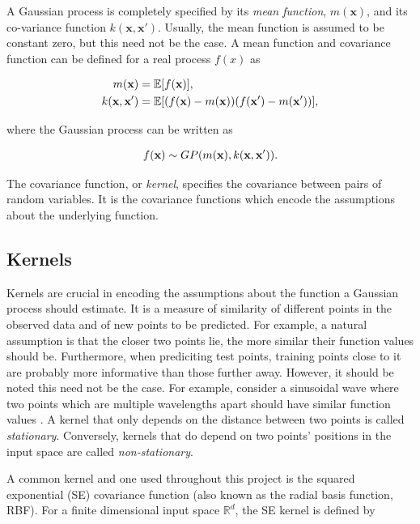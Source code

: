 \documentclass[12pt,a4paper]{report}
\theoremstyle{definition}
\begin{document}
A Gaussian process is completely specified by its \emph{mean function}, $m(\textbf{x})$, and its co-variance function $k(\textbf{x}, \textbf{x}')$.
Usually, the mean function is assumed to be constant zero, but this need not be the case.
A mean function and covariance function can be defined for a real process $f(x)$ as 

\begin{equation}
	\begin{aligned}
		\centering
		m(\textbf{x}) &= \mathbb{E}[f(\textbf{x})],\\
		k(\textbf{x}, \textbf{x}') &= \mathbb{E}[(f(\textbf{x}) - m(\textbf{x}))(f(\textbf{x}') - m(\textbf{x}'))],
	\end{aligned}
\end{equation}

where the Gaussian process can be written as 

\begin{equation}
	\centering
	f(\textbf{x}) \sim GP(m(\textbf{x}), k(\textbf{x}, \textbf{x}')).
\end{equation}

The covariance function, or \emph{kernel}, specifies the covariance between pairs of random variables. It is the covariance functions which encode the assumptions about the underlying function.

\subsection{Kernels} \label{sec:Kernels}

Kernels are crucial in encoding the assumptions about the function a Gaussian process should estimate. 
It is a measure of similarity of different points in the observed data and of new points to be predicted. 
For example, a natural assumption is that the closer two points lie, the more similar their function values should be. 
Furthermore, when prediciting test points, training points close to it are probably more informative than those further away. 
However, it should be noted this need not be the case. 
For example, consider a sinusoidal wave where two points which are multiple wavelengths apart should have similar function values \citep{Kaiser2017}.
A kernel that only depends on the distance between two points is called \emph{stationary}.
Conversely, kernels that do depend on two points' positions in the input space are called \emph{non-stationary}.

A common kernel and one used throughout this project is the squared exponential (SE) covariance function (also known as the radial basis function, RBF). 
For a finite dimensional input space $\mathbb{R}^d$, the SE kernel is defined by
\end{document}
